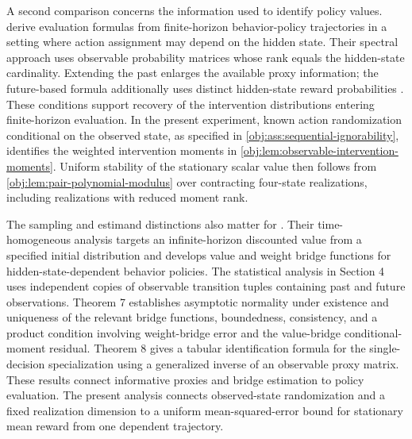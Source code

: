A second comparison concerns the information used to identify policy values. \citet[Section 4, Assumptions 2--4, and Theorems 2--4]{NairJiang2021} derive evaluation formulas from finite-horizon behavior-policy trajectories in a setting where action assignment may depend on the hidden state. Their spectral approach uses observable probability matrices whose rank equals the hidden-state cardinality. Extending the past enlarges the available proxy information; the future-based formula additionally uses distinct hidden-state reward probabilities \citep[Assumption 5 and Theorem 4]{NairJiang2021}. These conditions support recovery of the intervention distributions entering finite-horizon evaluation. In the present experiment, known action randomization conditional on the observed state, as specified in \cref{obj:ass:sequential-ignorability}, identifies the weighted intervention moments in \cref{obj:lem:observable-intervention-moments}. Uniform stability of the stationary scalar value then follows from \cref{obj:lem:pair-polynomial-modulus} over contracting four-state realizations, including realizations with reduced moment rank.

The sampling and estimand distinctions also matter for \citet[Section 4 and Theorems 7--8]{ShiUeharaHuangJiang2022}. Their time-homogeneous analysis targets an infinite-horizon discounted value from a specified initial distribution and develops value and weight bridge functions for hidden-state-dependent behavior policies. The statistical analysis in Section 4 uses independent copies of observable transition tuples containing past and future observations. Theorem 7 establishes asymptotic normality under existence and uniqueness of the relevant bridge functions, boundedness, consistency, and a product condition involving weight-bridge error and the value-bridge conditional-moment residual. Theorem 8 gives a tabular identification formula for the single-decision specialization using a generalized inverse of an observable proxy matrix. These results connect informative proxies and bridge estimation to policy evaluation. The present analysis connects observed-state randomization and a fixed realization dimension to a uniform mean-squared-error bound for stationary mean reward from one dependent trajectory.

